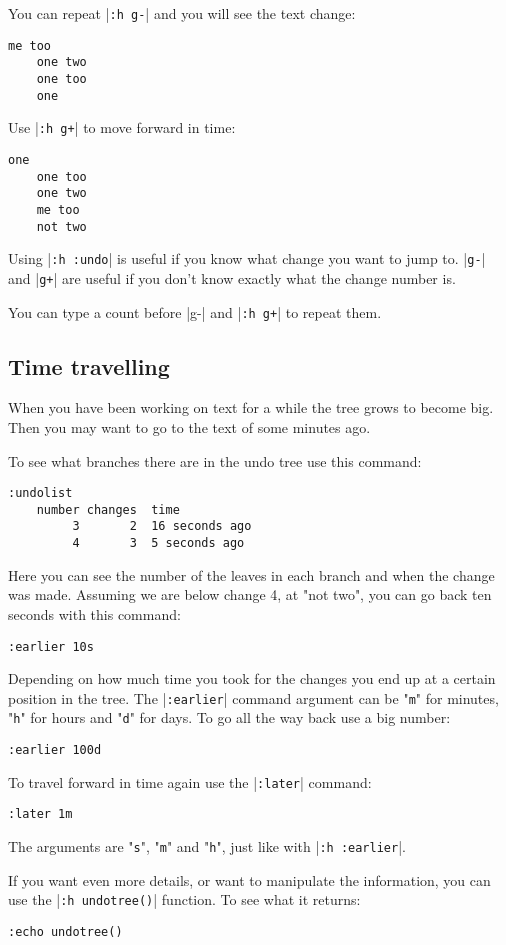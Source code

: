You can repeat |\verb!:h g-!| and you will see the text change:

\begin{Verbatim}[samepage=true]
    me too 
    one two 
    one too 
    one 
\end{Verbatim}

Use |\verb!:h g+!| to move forward in time:

\begin{Verbatim}[samepage=true]
    one 
    one too 
    one two 
    me too 
    not two 
\end{Verbatim}

Using |\verb!:h :undo!| is useful if you know what change you want to jump to.
|\verb!g-!| and |\verb!g+!| are useful if you don't know exactly what the change number is.

You can type a count before |g-| and |\verb!:h g+!| to repeat them.
\subsection{Time travelling}
When you have been working on text for a while the tree grows to become big.
Then you may want to go to the text of some minutes ago.

To see what branches there are in the undo tree use this command:

\begin{Verbatim}[samepage=true]
 :undolist
    number changes  time 
         3       2  16 seconds ago
         4       3  5 seconds ago
\end{Verbatim}

Here you can see the number of the leaves in each branch and when the change was made.
Assuming we are below change 4, at "not two", you can go back ten seconds with this command:

\begin{Verbatim}[samepage=true]
 :earlier 10s
\end{Verbatim}

Depending on how much time you took for the changes you end up at a certain position in the tree.
The |\verb!:earlier!| command argument can be "\verb!m!" for minutes, "\verb!h!" for hours and "\verb!d!" for days.
To go all the way back use a big number:

\begin{Verbatim}[samepage=true]
 :earlier 100d
\end{Verbatim}

To travel forward in time again use the |\verb!:later!| command:

\begin{Verbatim}[samepage=true]
 :later 1m
\end{Verbatim}

The arguments are "\verb!s!", "\verb!m!" and "\verb!h!", just like with |\verb!:h :earlier!|.

If you want even more details, or want to manipulate the information, you can use the |\verb!:h undotree()!| function.
To see what it returns:

\begin{Verbatim}[samepage=true]
 :echo undotree()
\end{Verbatim}
\clearpage
